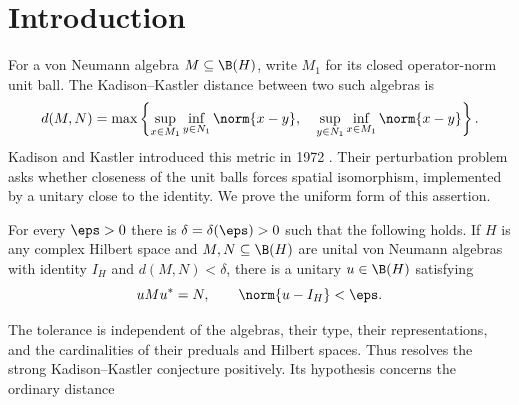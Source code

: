 \begin{abstract}
We prove that sufficiently close unital von Neumann algebras are
conjugate by a unitary arbitrarily close to the identity. The tolerance
depends only on the prescribed distance of that unitary from the
identity, uniformly over all algebras, representations, and Hilbert
spaces. This resolves the strong Kadison--Kastler conjecture.
\end{abstract}
\section{Introduction}
\label{sec:introduction}

For a von Neumann algebra $M\subseteq\B(H)$, write $M_1$ for its
closed operator-norm unit ball. The Kadison--Kastler distance between
two such algebras is
\begin{equation}\label{eq:kk-definition}
 d(M,N)=\max\left\{
 \sup_{x\in M_1}\inf_{y\in N_1}\norm{x-y},\quad
 \sup_{y\in N_1}\inf_{x\in M_1}\norm{x-y}\right\}.
\end{equation}
Kadison and Kastler introduced this metric in 1972
\cite{KadisonKastler1972}. Their perturbation problem asks whether
closeness of the unit balls forces spatial isomorphism, implemented by
a unitary close to the identity. We prove the uniform form of this
assertion.

\begin{theorem}\label{thm:main}
For every $\eps>0$ there is $\delta=\delta(\eps)>0$ such that the
following holds. If $H$ is any complex Hilbert space and
$M,N\subseteq\B(H)$ are unital von Neumann algebras with identity
$I_H$ and $d(M,N)<\delta$, there is a unitary $u\in\B(H)$ satisfying
\[
 uMu^*=N,\qquad \norm{u-I_H}<\eps.
\]
\end{theorem}

The tolerance is independent of the algebras, their type, their
representations, and the cardinalities of their preduals and Hilbert
spaces. Thus  resolves the strong Kadison--Kastler
conjecture positively. Its hypothesis concerns the ordinary distance
